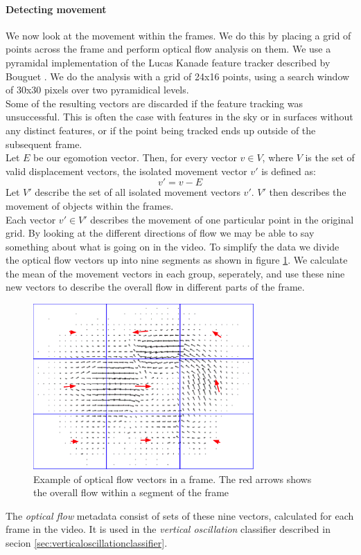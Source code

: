 \paragraph{Detecting movement}
%
We now look at the movement within the frames. We do this by placing a grid of points across the frame and perform optical flow analysis on them. We use a pyramidal implementation of the Lucas Kanade feature tracker described by Bouguet \cite{Bouguet2000}. We do the analysis with a grid of 24x16 points, using a search window of 30x30 pixels over two pyramidical levels.\\
Some of the resulting vectors are discarded if the feature tracking was unsuccessful. This is often the case with features in the sky or in surfaces without any distinct features, or if the point being tracked ends up outside of the subsequent frame.\\
Let $E$ be our egomotion vector. Then, for every vector $v \in V$, where $V$ is the set of valid displacement vectors, the isolated movement vector $v'$ is defined as:
\begin{equation}
v' = v - E
\end{equation}
Let $V'$ describe the set of all isolated movement vectors $v'$. $V'$ then describes the movement of objects within the frames.\\
Each vector $v' \in V'$ describes the movement of one particular point in the original grid. By looking at the different directions of flow we may be able to say something about what is going on in the video. To simplify the data we divide the optical flow vectors up into nine segments as shown in figure \ref{fig:opticalflow}. We calculate the mean of the movement vectors in each group, seperately, and use these nine new vectors to describe the overall flow in different parts of the frame.
%
%
\begin{figure}
     \centering
     \includegraphics[width=0.75\textwidth]{img/optical_flow.png}
     \caption{Example of optical flow vectors in a frame. The red arrows shows the overall flow within a segment of the frame}\label{fig:opticalflow}
\end{figure}
%
The \textit{optical flow} metadata consist of sets of these nine vectors, calculated for each frame in the video. It is used in the \textit{vertical oscillation} classifier described in secion \ref{sec:verticaloscillationclassifier}.
%
